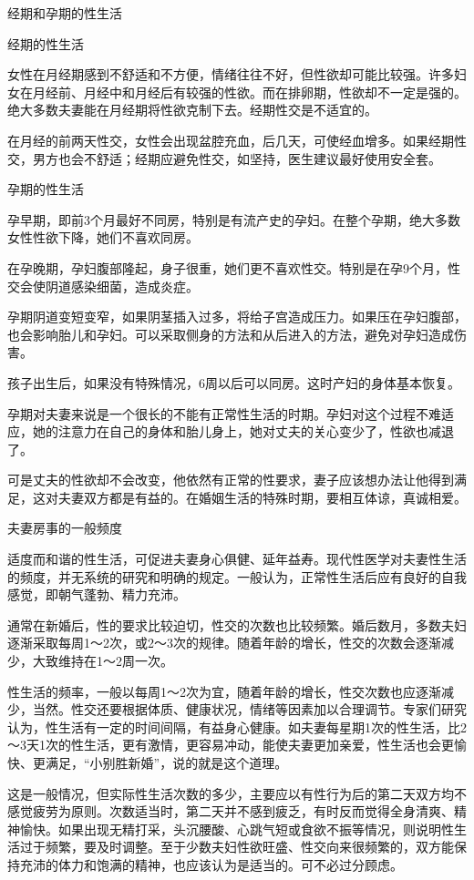 \documentclass[12pt,UTF8]{ctexbook}
\begin{document}
经期和孕期的性生活


经期的性生活

女性在月经期感到不舒适和不方便，情绪往往不好，但性欲却可能比较强。许多妇女在月经前、月经中和月经后有较强的性欲。而在排卵期，性欲却不一定是强的。绝大多数夫妻能在月经期将性欲克制下去。经期性交是不适宜的。

在月经的前两天性交，女性会出现盆腔充血，后几天，可使经血增多。如果经期性交，男方也会不舒适；经期应避免性交，如坚持，医生建议最好使用安全套。

孕期的性生活

孕早期，即前3个月最好不同房，特别是有流产史的孕妇。在整个孕期，绝大多数女性性欲下降，她们不喜欢同房。

在孕晚期，孕妇腹部隆起，身子很重，她们更不喜欢性交。特别是在孕9个月，性交会使阴道感染细菌，造成炎症。

孕期阴道变短变窄，如果阴茎插入过多，将给子宫造成压力。如果压在孕妇腹部，也会影响胎儿和孕妇。可以采取侧身的方法和从后进入的方法，避免对孕妇造成伤害。

孩子出生后，如果没有特殊情况，6周以后可以同房。这时产妇的身体基本恢复。

孕期对夫妻来说是一个很长的不能有正常性生活的时期。孕妇对这个过程不难适应，她的注意力在自己的身体和胎儿身上，她对丈夫的关心变少了，性欲也减退了。

可是丈夫的性欲却不会改变，他依然有正常的性要求，妻子应该想办法让他得到满足，这对夫妻双方都是有益的。在婚姻生活的特殊时期，要相互体谅，真诚相爱。





夫妻房事的一般频度


适度而和谐的性生活，可促进夫妻身心俱健、延年益寿。现代性医学对夫妻性生活的频度，并无系统的研究和明确的规定。一般认为，正常性生活后应有良好的自我感觉，即朝气蓬勃、精力充沛。

通常在新婚后，性的要求比较迫切，性交的次数也比较频繁。婚后数月，多数夫妇逐渐采取每周1～2次，或2～3次的规律。随着年龄的增长，性交的次数会逐渐减少，大致维持在1～2周一次。

性生活的频率，一般以每周1～2次为宜，随着年龄的增长，性交次数也应逐渐减少，当然。性交还要根据体质、健康状况，情绪等因素加以合理调节。专家们研究认为，性生活有一定的时间间隔，有益身心健康。如夫妻每星期1次的性生活，比2～3天1次的性生活，更有激情，更容易冲动，能使夫妻更加亲爱，性生活也会更愉快、更满足，“小别胜新婚”，说的就是这个道理。

这是一般情况，但实际性生活次数的多少，主要应以有性行为后的第二天双方均不感觉疲劳为原则。次数适当时，第二天并不感到疲乏，有时反而觉得全身清爽、精神愉快。如果出现无精打采，头沉腰酸、心跳气短或食欲不振等情况，则说明性生活过于频繁，要及时调整。至于少数夫妇性欲旺盛、性交向来很频繁的，双方能保持充沛的体力和饱满的精神，也应该认为是适当的。可不必过分顾虑。
\end{document}
